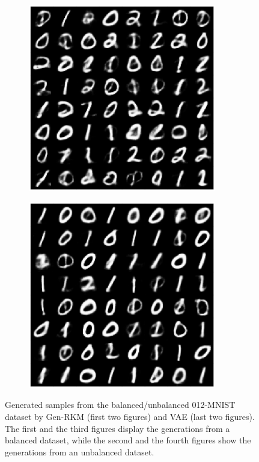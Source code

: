 \begin{figure}[htb]
\begin{subfigure}{0.24\textwidth}
    \end{subfigure}
    \hfill
    \begin{subfigure}{0.24\textwidth}
        \centering
        \includegraphics[width=0.9\textwidth]{Figures/PS_v2/vae-bMNIST012-gensamples.png}
    \end{subfigure}
    \hfill
    \begin{subfigure}{0.24\textwidth}
        \centering
        \includegraphics[width=0.9\textwidth]{Figures/PS_v2/vae-ubMNIST012-gensamples.png}
    \end{subfigure}
    \caption{Generated samples from the balanced/unbalanced 012-MNIST dataset by Gen-RKM (first two figures) and VAE (last two figures). The first and the third figures display the generations from a balanced dataset, while the second and the fourth figures show the generations from an unbalanced dataset.}
    \label{fig-mnist}
\end{figure}